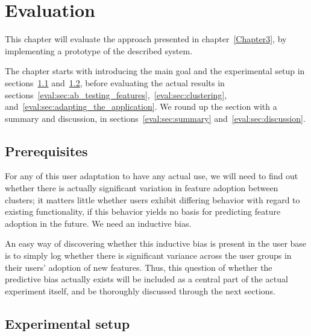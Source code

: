 \chapter{Evaluation}

\label{Chapter4}


This chapter will evaluate the approach presented in chapter~\ref{Chapter3}, by implementing a prototype of the described system.

The chapter starts with introducing the main goal and the experimental setup in sections~\ref{eval:sec:prerequisites} and~\ref{eval:sec:experimental_setup},
before evaluating the actual results in sections~\ref{eval:sec:ab_testing_features},~\ref{eval:sec:clustering}, and~\ref{eval:sec:adapting_the_application}.
We round up the section with a summary and discussion, in sections~\ref{eval:sec:summary} and~\ref{eval:sec:discussion}.

\section{Prerequisites} %
\label{eval:sec:prerequisites}

For any of this user adaptation to have any actual use, we will need to find out whether there is actually significant variation in feature adoption between clusters; it matters little whether users exhibit differing behavior with regard to existing functionality, if this behavior yields no basis for predicting feature adoption in the future. We need an inductive bias.

An easy way of discovering whether this inductive bias is present in the user base is to simply log whether there is significant variance across the user groups in their users' adoption of new features. Thus, this question of whether the predictive bias actually exists will be included as a central part of the actual experiment itself, and be thoroughly discussed through the next sections.


\section{Experimental setup} %
\label{eval:sec:experimental_setup}

